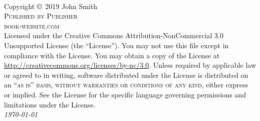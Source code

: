 \documentclass[11pt,fleqn]{book} %
\begin{document}
    \begingroup
    \thispagestyle{empty} %
    \vfill
    \endgroup
    \newpage
    ~\vfill
    \thispagestyle{empty}
    
    \noindent Copyright \copyright\ 2019 John Smith\\ %
    \noindent \textsc{Published by Publisher}\\ %
    \noindent \textsc{book-website.com}\\ %
    \noindent Licensed under the Creative Commons Attribution-NonCommercial 3.0 
    Unsupported License (the ``License''). You may not use this file except in 
    compliance with the License. You may obtain a copy of the License at 
    \url{http://creativecommons.org/licenses/by-nc/3.0}. Unless required by 
    applicable law or agreed to in writing, software distributed under the 
    License is distributed on an \textsc{``as is'' basis, without warranties or 
    conditions of any kind}, either express or implied. See the License for the 
    specific language governing permissions and limitations under the 
    License.\\
    \noindent 
    \textit{\today}
    \pagestyle{empty} %
    \tableofcontents %
    \cleardoublepage %
    \pagestyle{fancy} %
\end{document}
